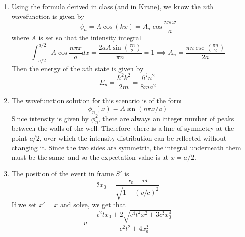 \documentclass[fleqn]{article}[12pt]
\begin{document}
\begin{enumerate}
        \item Using the formula derived in class (and in Krane), we know the $n$th wavefunction is given by
        \begin{equation*}
            \psi_n = A\cos (kx) = A_n \cos \frac{n \pi x}{a}
        \end{equation*}
        where $A$ is set so that the intensity integral
        \begin{equation*}
            \int_{-a/2}^{a/2} A \cos \frac{n \pi x}{a} dx = \frac{2 a A \sin \left(\frac{\pi  n}{2}\right)}{\pi  n} = 1
            \implies A_n = \frac{\pi  n \csc \left(\frac{\pi  n}{2}\right)}{2 a}
        \end{equation*}
        Then the energy of the $n$th state is given by
        \begin{equation*}
            E_n = \frac{\hbar^2k^2}{2m} = \frac{\hbar^2n^2}{8ma^2}
        \end{equation*}

        \item The wavefunction solution for this scenario is of the form
        \begin{equation*}
            \phi_n(x) = A \sin (n \pi x/a)
        \end{equation*}
        Since intensity is given by $\phi_n^2$, there are always an integer number of peaks between the walls of the well. Therefore, there is a line of symmetry at the point $a/2$, over which the intensity distribution can be reflected without changing it. Since the two sides are symmetric, the integral underneath them must be the same, and so the expectation value is at $x = a/2$.

        \item The position of the event in frame $S'$ is
        \begin{equation*}
            2x_0 = \frac{x_0-vt}{\sqrt{1-(v/c)^2}}
        \end{equation*}
        If we set $x'=x$ and solve, we get that
        \begin{equation*}
            v = \frac{c^2 t x_0+2 \sqrt{c^4 t^2 x^2+3 c^2 x_0^4}}{c^2 t^2+4 x_0^2}
        \end{equation*}
    \end{enumerate}
\end{document}
